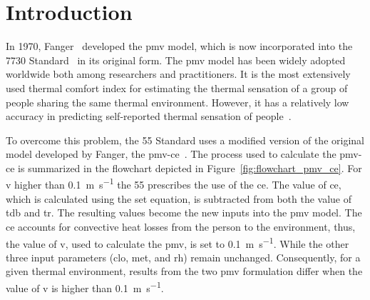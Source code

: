 \section{Introduction}\label{sec:introduction}

In 1970, Fanger~\cite{Fanger1970} developed the \ac{pmv} model, which is now incorporated into the \gls{7730} Standard~\cite{iso7730} in its original form.
The \ac{pmv} model has been widely adopted worldwide both among researchers and practitioners.
It is the most extensively used thermal comfort index for estimating the thermal sensation of a group of people sharing the same thermal environment.
However, it has a relatively low accuracy in predicting self-reported thermal sensation of people~\cite{Cheung2019}.

To overcome this problem, the \gls{55} Standard uses a modified version of the original model developed by Fanger, the \gls{pmv-ce}~\cite{ashrae552020}.
The process used to calculate the \gls{pmv-ce} is summarized in the flowchart depicted in Figure~\ref{fig:flowchart_pmv_ce}.
For \ac{v} higher than \qty{0.1}{\m\per\s} the \gls{55} prescribes the use of the \ac{ce}.
The value of \ac{ce}, which is calculated using the \ac{set} equation, is subtracted from both the value of \ac{tdb} and \ac{tr}.
The resulting values become the new inputs into the \ac{pmv} model.
The \ac{ce} accounts for convective heat losses from the person to the environment, thus, the value of \ac{v}, used to calculate the \ac{pmv}, is set to \qty{0.1}{\m\per\s}.
While the other three input parameters (\ac{clo}, \ac{met}, and \ac{rh}) remain unchanged.
Consequently, for a given thermal environment, results from the two \ac{pmv} formulation differ when the value of \ac{v} is higher than \qty{0.1}{\m\per\s}.

